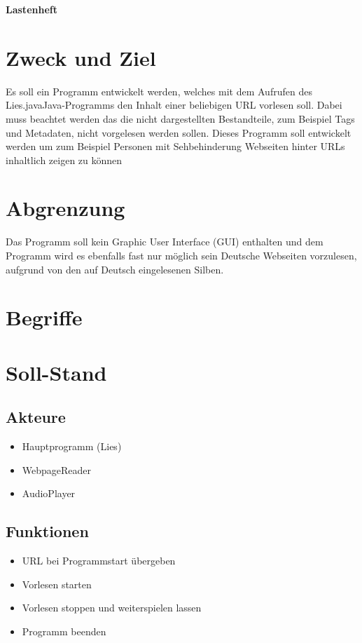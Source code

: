 \documentclass[11pt]{scrartcl}
\begin{document}
\begin{center}
\textbf{Lastenheft}
\end{center}

\section{Zweck und Ziel}
Es soll ein Programm entwickelt werden, welches mit dem Aufrufen des \glqq Lies.java\grqq Java-Programms den Inhalt einer beliebigen URL vorlesen soll. Dabei muss beachtet werden das die nicht dargestellten Bestandteile, zum Beispiel Tags und Metadaten, nicht vorgelesen werden sollen. Dieses Programm soll entwickelt werden um zum Beispiel Personen mit Sehbehinderung Webseiten hinter URLs inhaltlich zeigen zu können

\section{Abgrenzung}
Das Programm soll kein Graphic User Interface (GUI) enthalten und dem Programm wird es ebenfalls fast nur möglich sein Deutsche Webseiten vorzulesen, aufgrund von den auf Deutsch eingelesenen Silben.

\section{Begriffe}


\section{Soll-Stand}


\subsection{Akteure}

\begin{itemize}
	\item Hauptprogramm (Lies)
	\item WebpageReader
	\item AudioPlayer
\end{itemize}

\subsection{Funktionen}

\begin{itemize}
	\item URL bei Programmstart übergeben
	\item Vorlesen starten
	\item Vorlesen stoppen und weiterspielen lassen
	\item Programm beenden
\end{itemize}
\end{document}
